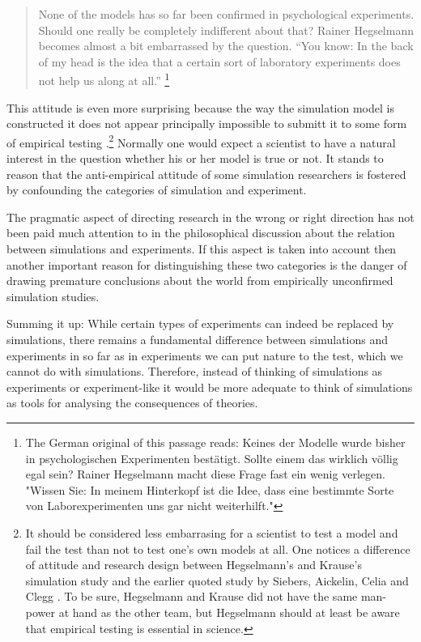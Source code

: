 \documentclass[onecollarge]{STJour}
\numberwithin{equation}{section}
\begin{document}
\begin{quote}

None of the models has so far been confirmed in psychological
experiments. Should one really be completely indifferent about that?
Rainer Hegselmann becomes almost a bit embarrassed by the question.
``You know: In the back of my head is the idea that a certain sort of
laboratory experiments does not help us along at all.'' 
\citep[p.\ 2]{groetker:2005} \footnote{The German original of this
passage reads: Keines der Modelle wurde bisher in psychologischen Experimenten
bestätigt. Sollte einem das wirklich völlig egal sein? Rainer Hegselmann
macht diese Frage fast ein wenig verlegen. "Wissen Sie: In meinem
Hinterkopf ist die Idee, dass eine bestimmte Sorte von Laborexperimenten
uns gar nicht weiterhilft."}

\end{quote}

This attitude is even more surprising because the way the simulation
model is constructed it does not appear principally impossible to submitt
it to some form of empirical testing
\citep{hegselmann-krause:2002}.\footnote{It should be considered less
embarrasing for a scientist to test a model and fail the test than not to
test one's own models at all. One notices a difference of attitude and
research design between Hegselmann's and Krause's simulation study
\citep{hegselmann-krause:2002} and the earlier quoted study by Siebers,
Aickelin, Celia and Clegg \citep{siebers-et-al:2010}. To be sure,
Hegselmann and Krause did not have the same man-power at hand as the
other team, but Hegselmann should at least be aware that empirical
testing is essential in science.} Normally one would expect a scientist
to have a natural interest in the question whether his or her model is
true or not. It stands to reason that the anti-empirical attitude of some
simulation researchers is fostered by confounding the categories of
simulation and experiment.

The pragmatic aspect of directing research in the wrong or right
direction has not been paid much attention to in the philosophical
discussion about the relation between simulations and experiments. If
this aspect is taken into account then another important reason for
distinguishing these two categories is the danger of drawing
premature conclusions about the world from empirically unconfirmed
simulation studies.

Summing it up: While certain types of experiments can indeed be replaced
by simulations, there remains a fundamental difference between
simulations and experiments in so far as in experiments we can put
nature to the test, which we cannot do with simulations. Therefore,
instead of thinking of simulations as experiments or experiment-like it
would be more adequate to think of simulations as tools for analysing
the consequences of theories. 
\end{document}
